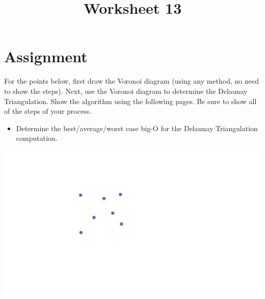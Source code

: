 \documentclass[a4paper,12pt]{article}
\title{Worksheet 13}
\begin{document}
\maketitle

\worksheetGroundRules


\worksheetSubmission



\vspace{5pt}
\section{Assignment}

For the points below, first draw the Voronoi diagram (using any method, no need to show the steps). Next, use the Voronoi diagram to determine the Delaunay Triangulation. Show the algorithm using the following pages. Be sure to show all of the steps of your process.

\begin{itemize}
\item Determine the best/average/worst case big-O for the Delaunay Triangulation computation.


\end{itemize}


\begin{center}
\includegraphics[width=0.65\linewidth]{../images/voronoi7.pdf}
\end{center}



\newpage
\end{document}
